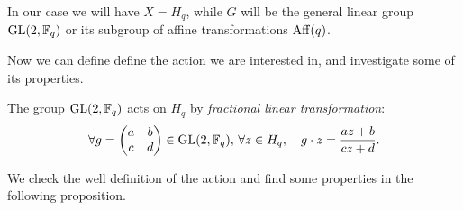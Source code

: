 In our case we will have $X=H_q$, while $G$ will be the general linear group $\operatorname{GL}(2,{\mathbb F}_q)$ or its subgroup of
affine transformations $\operatorname{Aff} (q)$.

Now we can define define the action we are interested in, and investigate some of its properties.
\begin{defn}\label{flt}
The group $\operatorname{GL}(2,{\mathbb F}_q)$ acts on $H_q$ by {\it fractional linear transformation}:
\begin{equation}
	\forall g= \begin{pmatrix} a & b \\ c & d \end{pmatrix}\in \operatorname{GL}(2,{\mathbb F}_q),\, \forall z \in H_q, \quad g \cdot z = \frac{az+b}{cz+d}.
\end{equation}
\end{defn}

We check the well definition of the action and find some properties in the following proposition.


